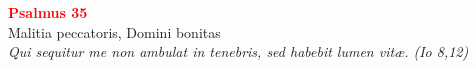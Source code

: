 


\def\greinitialformat#1{%
{\fontsize{39}{39}\selectfont #1}%
}




\vspace{0.3cm}
\begin{center}
 \textcolor{red}{\large \bf Psalmus 35}\\
Malitia peccatoris, Domini bonitas\\
\textit{\small Qui sequitur me non ambulat in tenebris, sed habebit lumen vitæ. (Io 8,12)}
\end{center}
